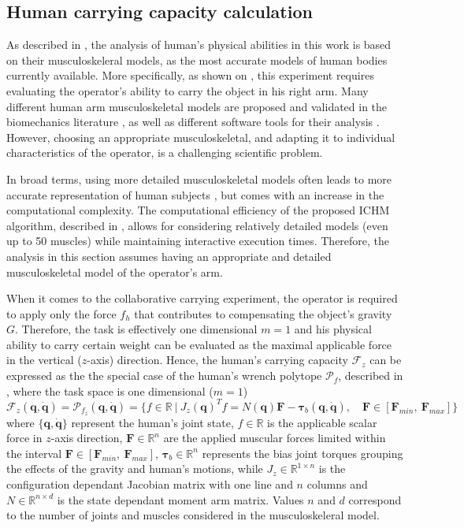 \subsection{Human carrying capacity calculation}
\label{sec:human_carrying_capacity}

As described in , the analysis of human's physical abilities in this work is based on their musculoskeleral models, as the most accurate models of human bodies currently available.
More specifically, as shown on , this experiment requires evaluating the operator's ability to carry the object in his right arm. 
Many different human arm musculoskeletal models are proposed and validated in the biomechanics literature \cite{holzbaur2005model,saul2015benchmarking}, as well as different software tools for their analysis \cite{opensim,Bouchard2009}. 
However, choosing an appropriate musculoskeletal, and adapting it to individual characteristics of the operator, is a challenging scientific problem. 

In broad terms, using more detailed musculoskeletal models often leads to more accurate representation of human subjects \cite{sohn2019effects}, but comes with an increase in the computational complexity. 
The computational efficiency of the proposed ICHM algorithm, described in , allows for considering relatively detailed models (even up to 50 muscles) while maintaining interactive execution times. 
Therefore, the analysis in this section assumes having an appropriate and detailed musculoskeletal model of the operator's arm. 

When it comes to the collaborative carrying experiment, the operator is required to apply only the force $f_{h}$ that contributes to compensating the object's gravity $G$. Therefore, the task is effectively one dimensional $m=1$ and his physical ability to carry certain weight can be evaluated as the maximal applicable force in the vertical ($z$-axis) direction. Hence, the human's carrying capacity $\mathcal{F}_z$ can be expressed as the the special case of the human's wrench polytope $\mathcal{P}_{f}$, described in  , where the task space is one dimensional ($m=1$)
\begin{equation}
     \mathcal{F}_z(\bm{q},\dot{\bm{q}}) = \mathcal{P}_{f_z} (\bm{q},\dot{\bm{q}}) = \{ f \in \mathbb{R} ~|~ J_{z}(\bm{q})^Tf=N(\bm{q})\bm{F} - \bm{\tau}_b(\bm{q},\dot{\bm{q}}), \quad \bm{F}\in[\bm{F}_{min}, ~\bm{F}_{max}]\}
\end{equation}
where $\{\bm{q},\dot{\bm{q}}\}$ represent the human's joint state, $f \in\mathbb{R}$ is the applicable scalar force in $z$-axis direction, $\bm{F}\in\mathbb{R}^n$ are the applied muscular forces limited within the interval $\bm{F}\in[\bm{F}_{min}, ~\bm{F}_{max}]$, $\bm{\tau}_{b}\in\mathbb{R}^n$ represents the bias joint torques grouping the effects of the gravity and human's motions, while $J_{z}\in\mathbb{R}^{1\times n}$ is the configuration dependant Jacobian matrix with one line and $n$ columns and $N\in\mathbb{R}^{n\times d}$ is the state dependant moment arm matrix. Values $n$ and $d$ correspond to the number of joints and muscles considered in the musculoskeleral model.

